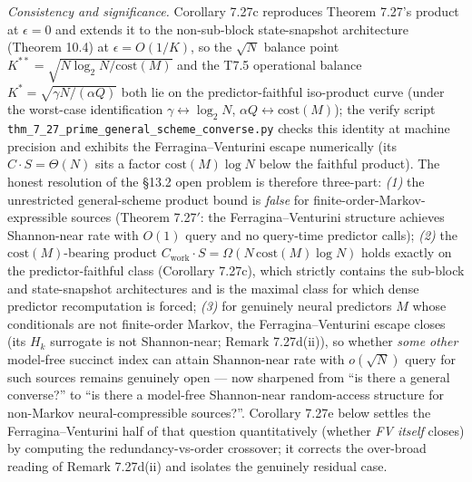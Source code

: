 \documentclass[
]{article}
\begin{document}
\emph{Consistency and significance.} Corollary 7.27c reproduces Theorem
7.27's product at $\epsilon = 0$ and extends it to the non-sub-block
state-snapshot architecture (Theorem 10.4) at $\epsilon = O(1/K)$, so
the $\sqrt N$ balance point $K^{**} = \sqrt{N \log_2 N / \mathrm{cost}
(M)}$ and the T7.5 operational balance $K^{*} = \sqrt{\gamma N /
(\alpha Q)}$ both lie on the predictor-faithful iso-product curve (under
the worst-case identification $\gamma \leftrightarrow \log_2 N$,
$\alpha Q \leftrightarrow \mathrm{cost}(M)$); the verify script
\texttt{thm\_7\_27\_prime\_general\_scheme\_converse.py} checks this
identity at machine precision and exhibits the Ferragina--Venturini
escape numerically (its $C \cdot S = \Theta(N)$ sits a factor
$\mathrm{cost}(M)\log N$ below the faithful product). The honest
resolution of the §13.2 open problem is therefore three-part:
\emph{(1)} the unrestricted general-scheme product bound is \emph{false}
for finite-order-Markov-expressible sources (Theorem 7.27$'$: the
Ferragina--Venturini structure achieves Shannon-near rate with $O(1)$
query and no query-time predictor calls); \emph{(2)} the
$\mathrm{cost}(M)$-bearing product $C_{\mathrm{work}} \cdot S =
\Omega(N\,\mathrm{cost}(M)\log N)$ holds exactly on the
predictor-faithful class (Corollary 7.27c), which strictly contains the
sub-block and state-snapshot architectures and is the maximal class for
which dense predictor recomputation is forced; \emph{(3)} for genuinely
neural predictors $M$ whose conditionals are not finite-order Markov,
the Ferragina--Venturini escape closes (its $H_k$ surrogate is not
Shannon-near; Remark 7.27d(ii)), so whether \emph{some other} model-free
succinct index can attain Shannon-near rate with $o(\sqrt{N})$ query for
such sources remains genuinely open --- now sharpened from ``is there a
general converse?'' to ``is there a model-free Shannon-near
random-access structure for non-Markov neural-compressible sources?''.
Corollary 7.27e below settles the Ferragina--Venturini half of that
question quantitatively (whether \emph{FV itself} closes) by computing
the redundancy-vs-order crossover; it corrects the over-broad reading of
Remark 7.27d(ii) and isolates the genuinely residual case.
\end{document}
